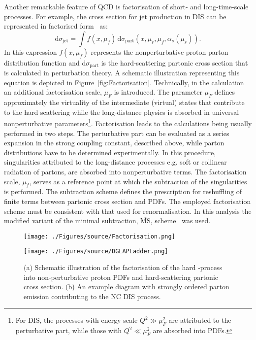 Another remarkable feature of QCD is factorisation of short- and long-time-scale processes. For example, the cross section for jet production in DIS can be represented in factorised form~\cite{Collins:1989gx} as:
\begin{equation}
 \mathrm{d}\sigma_{\mathrm{jet}} = \int{f\left(x,\mu_f\right)}\, \mathrm{d}\sigma_{\mathrm{part}}\left(x,\mu_r, \mu_f, \alpha_s\left(\mu_r\right) \right).
\label{eq:disfactorisation}
\end{equation} 
In this expression $f\left(x,\mu_f\right)$ represents the nonperturbative proton parton distribution function and $\mathrm{d}\sigma_{\mathrm{part}}$ is the hard-scattering partonic cross section that is calculated in perturbation theory. A schematic illustration representing this equation is depicted in Figure~\ref{fig:Factorisation}. Technically, in the calculation an additional factorisation scale, $\mu_F$ is introduced. The parameter $\mu_F$ defines approximately the virtuality of the intermediate (virtual) states that contribute to the hard scattering while the long-distance physics is absorbed in universal nonperturbative parameters\footnote{For DIS, the processes with energy scale $Q^2 \gg \mu_F^2 $ are attributed to the perturbative part, while those with $Q^2 \ll \mu_F^2 $ are absorbed into PDFs.}. Factorisation leads to the calculations being usually performed in two steps. The perturbative part can be evaluated as a series expansion in the strong coupling constant, described above, while parton distributions have to be determined experimentally. In this procedure, singularities attributed to the long-distance processes e.g. soft or collinear radiation of partons, are absorbed into nonperturbative terms. The factorisation scale, $\mu_f$, serves as a reference point at which the subtraction of the singularities is performed. The subtraction scheme defines the prescription for reshuffling of finite terms between partonic cross section and PDFs. The employed factorisation scheme must be consistent with that used for renormalisation. In this analysis the modified variant of the minimal subtraction, $\overline{\mathrm{MS}}$, scheme~\cite{Bardeen:1978yd} was used.
\begin{figure}[t]
	\centering
	\begin{subfloat}[]{
		\texttt{[image: ./Figures/source/Factorisation.png]}
		\label{fig:Factorisation}
	 }%
	\end{subfloat}
	\begin{subfloat}[]{
		\texttt{[image: ./Figures/source/DGLAPLadder.png]}
		\label{fig:DGLAPLadder}
	}%
	\end{subfloat}
	\caption{(a) Schematic illustration of the factorisation of the hard \ep-process into non-perturbative proton PDFs and hard-scattering partonic cross section. (b) An example diagram with strongly ordered parton emission contributing to the NC DIS process.}
	\label{fig:factorisationdglapladder}
\end{figure}
